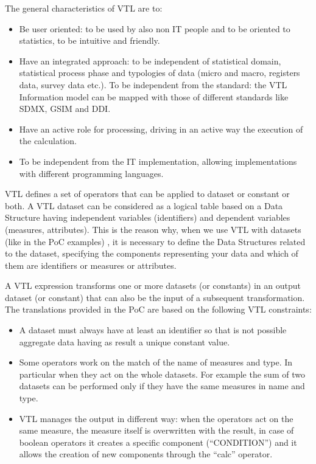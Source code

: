 The general characteristics of VTL are to:
\begin{itemize}
\item
Be user oriented: to be used by also non IT people and to be oriented to statistics, to be intuitive and friendly.

\item
Have an integrated approach: to be independent of statistical domain,  statistical process phase and typologies of data (micro and macro, registers data, survey data etc.). To be independent from the standard: the VTL Information model can be mapped with those of different standards like SDMX, GSIM and DDI.

\item
Have an active role for processing, driving in an active way the execution of the calculation.

\item
To be independent from the IT implementation, allowing implementations with different programming languages.

\end{itemize}

VTL defines a set of operators that can be applied to dataset or constant or both. A VTL dataset can be considered as a logical table based on a Data Structure having independent variables (identifiers) and dependent variables (measures, attributes). This is the reason why, when we use VTL with datasets (like in the PoC examples) , it is necessary to define the Data Structures related to the dataset, specifying  the components representing your data and which of them are identifiers or measures or attributes.

A VTL expression transforms one or more datasets (or constants) in an output dataset (or constant) that can also be the input of a subsequent transformation.
The translations provided in the PoC are based on the following VTL constraints:

\begin{itemize}

\item
A dataset must always have at least an identifier so that is not possible aggregate data having as result  a unique constant value.

\item
Some operators work on the match of the name of measures  and type. In particular when they act on the whole datasets. For example the sum of two datasets can be performed only if they have the same measures in name and type.

\item
VTL manages the output in different way: when the operators act on the same measure, the measure itself is overwritten with the result, in case of boolean operators it creates a specific component (“CONDITION”) and it allows the creation of new components through the “calc” operator.

\end{itemize}

